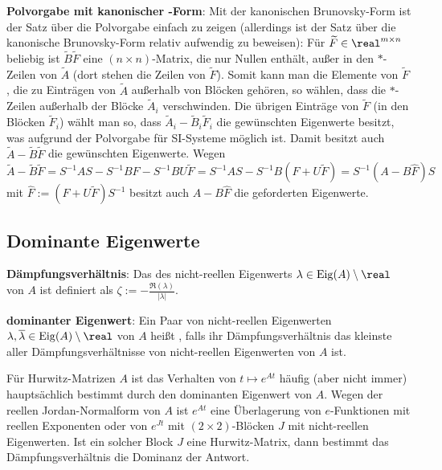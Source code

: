 \textbf{Polvorgabe mit kanonischer -Form}:
Mit der kanonischen Brunovsky-Form ist der Satz über die Polvorgabe einfach zu zeigen
(allerdings ist der Satz über die kanonische Brunovsky-Form relativ aufwendig zu beweisen):
Für $\widetilde{F} \in \real^{m \times n}$ beliebig ist $\widetilde{B}\widetilde{F}$
eine $(n \times n)$-Matrix, die nur Nullen enthält, außer in den $\ast$-Zeilen von $\widetilde{A}$
(dort stehen die Zeilen von $\widetilde{F}$).
Somit kann man die Elemente von $\widetilde{F}$, die zu Einträgen von $\widetilde{A}$ außerhalb von
Blöcken gehören, so wählen, dass die $\ast$-Zeilen außerhalb der Blöcke $\widetilde{A}_i$
verschwinden.
Die übrigen Einträge von $\widetilde{F}$ (in den Blöcken $\widetilde{F}_i$) wählt man so, dass
$\widetilde{A}_i - \widetilde{B}_i \widetilde{F}_i$
die gewünschten Eigenwerte besitzt, was aufgrund der Polvorgabe für SI-Systeme möglich ist.
Damit besitzt auch $\widetilde{A} - \widetilde{B} \widetilde{F}$ die gewünschten Eigenwerte.
Wegen\\
$\widetilde{A} - \widetilde{B} \widetilde{F}
= S^{-1}AS - S^{-1}BF - S^{-1}BU \widetilde{F}
= S^{-1}AS - S^{-1}B(F + U\widetilde{F})
= S^{-1} (A - B\widehat{F}) S$
mit $\widehat{F} := (F + U\widetilde{F}) S^{-1}$
besitzt auch $A - B\widehat{F}$ die geforderten Eigenwerte.

\pagebreak

\subsection{%
    Dominante Eigenwerte%
}

\textbf{Dämpfungsverhältnis}:
Das  des nicht-reellen Eigenwerts
$\lambda \in \Eig(A) \setminus \real$ von $A$ ist definiert als
$\zeta := -\frac{\Re(\lambda)}{|\lambda|}$.

\textbf{dominanter Eigenwert}:
Ein Paar von nicht-reellen Eigenwerten $\lambda, \overline{\lambda} \in \Eig(A) \setminus \real$
von $A$ heißt , falls ihr Dämpfungsverhältnis das kleinste aller
Dämpfungsverhältnisse von nicht-reellen Eigenwerten von $A$ ist.

Für Hurwitz-Matrizen $A$ ist das Verhalten von $t \mapsto e^{At}$ häufig (aber nicht immer)
hauptsächlich bestimmt durch den dominanten Eigenwert von $A$.
Wegen der reellen Jordan-Normalform von $A$ ist $e^{At}$ eine Überlagerung von $e$-Funktionen
mit reellen Exponenten oder von $e^{Jt}$ mit $(2 \times 2)$-Blöcken $J$ mit
nicht-reellen Eigenwerten.
Ist ein solcher Block $J$ eine Hurwitz-Matrix, dann bestimmt das Dämpfungsverhältnis die
Dominanz der Antwort.

